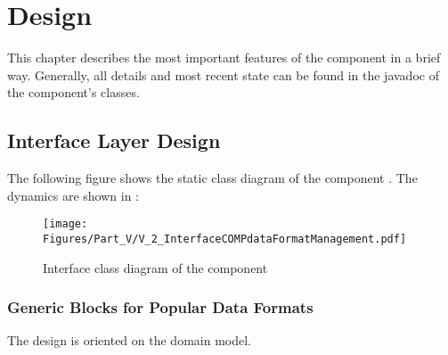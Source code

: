 
\section{\COMPdataFormatManagement{} Design}
\label{sec:COMPdataFormatManagementImplementationDesign}

This chapter describes the most important features of the \COMPdataFormatManagement{} component in a brief way. Generally, all details and most recent state can be found in the javadoc of the component's classes.


\subsection{Interface Layer Design}
\label{sec:InterfaceDesignCOMPdataFormatManagement}

The following figure shows the static class diagram of the component \COMPdataFormatManagement{}. The dynamics are shown in :

\begin{figure}[H]
	\centering
	\texttt{[image: Figures/Part\_V/V\_2\_InterfaceCOMPdataFormatManagement.pdf]}
	\caption{Interface class diagram of the component \COMPdataFormatManagement{}}
	\label{fig:V_2_InterfaceCOMPdataFormatManagement}
\end{figure}


\subsubsection{Generic Blocks for Popular Data Formats}
\label{sec:GenericBlocksForPopularDataFormats}

The design is oriented on the domain model.

